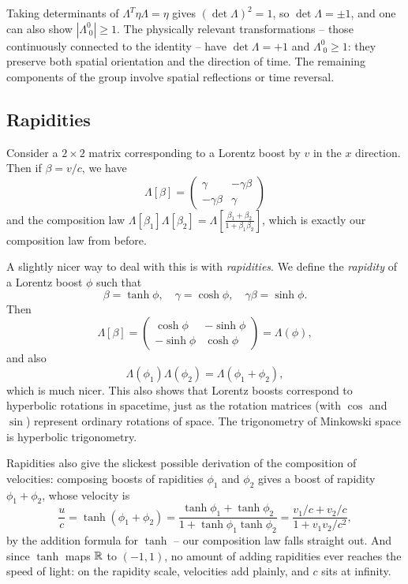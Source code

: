 \documentclass[a4paper]{scrartcl}
\begin{document}
\begin{remark}
	Taking determinants of $\Lambda^T \eta \Lambda = \eta$ gives $(\det \Lambda)^2 = 1$, so $\det \Lambda = \pm 1$, and one can also show $|\Lambda^0_{\;0}| \geq 1$. The physically relevant transformations -- those continuously connected to the identity -- have $\det \Lambda = +1$ and $\Lambda^0_{\;0} \geq 1$: they preserve both spatial orientation and the direction of time. The remaining components of the group involve spatial reflections or time reversal.
\end{remark}

\subsection{Rapidities}

Consider a $2 \times 2$ matrix corresponding to a Lorentz boost by $v$ in the $x$ direction. Then if $\beta = v/c$, we have
$$
\Lambda[\beta] = \begin{pmatrix}
	\gamma & -\gamma \beta \\
	-\gamma \beta & \gamma
\end{pmatrix}
$$
and the composition law $\Lambda[\beta_1] \Lambda[\beta_2] = \Lambda\left[\frac{\beta_1 + \beta_2}{1 + \beta_1 \beta_2}\right]$,
which is exactly our composition law from before.

A slightly nicer way to deal with this is with \emph{rapidities}.
We define the \emph{rapidity} of a Lorentz boost $\phi$ such that
$$
\beta = \tanh \phi, \quad \gamma = \cosh \phi,\quad \gamma \beta = \sinh \phi.
$$
Then
$$
\Lambda[\beta] = \begin{pmatrix}
	\cosh \phi & - \sinh \phi \\
	-\sinh \phi & \cosh \phi 
\end{pmatrix} = \Lambda(\phi),
$$
and also
$$
\Lambda(\phi_1) \Lambda(\phi_2) = \Lambda(\phi_1 + \phi_2),
$$
which is much nicer. This also shows that Lorentz boosts correspond to hyperbolic rotations in spacetime, just as the rotation matrices (with $\cos$ and $\sin$) represent ordinary rotations of space. The trigonometry of Minkowski space is hyperbolic trigonometry.

Rapidities also give the slickest possible derivation of the composition of velocities: composing boosts of rapidities $\phi_1$ and $\phi_2$ gives a boost of rapidity $\phi_1 + \phi_2$, whose velocity is
$$
\frac{u}{c} = \tanh(\phi_1 + \phi_2) = \frac{\tanh \phi_1 + \tanh\phi_2}{1 + \tanh\phi_1 \tanh\phi_2} = \frac{v_1/c + v_2/c}{1 + v_1v_2/c^2},
$$
by the addition formula for $\tanh$ -- our composition law falls straight out. And since $\tanh$ maps $\mathbb{R}$ to $(-1, 1)$, no amount of adding rapidities ever reaches the speed of light: on the rapidity scale, velocities add plainly, and $c$ sits at infinity.
\end{document}
